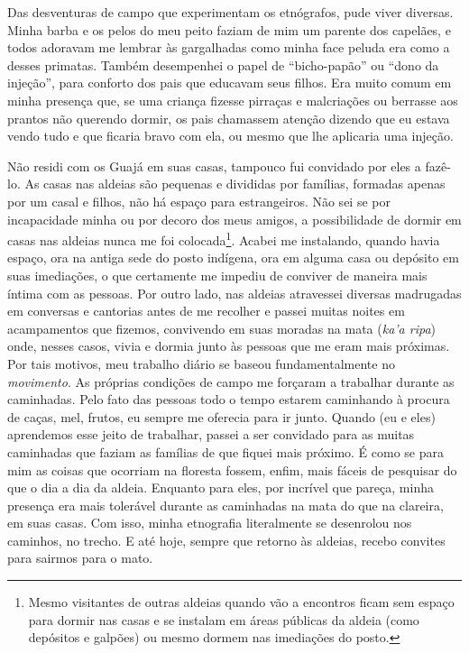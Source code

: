 Das desventuras de campo que experimentam os etnógrafos, pude viver
diversas. Minha barba e os pelos do meu peito faziam de mim um parente
dos capelães, e todos adoravam me lembrar às gargalhadas como minha face
peluda era como a desses primatas. Também desempenhei o papel de
``bicho-papão'' ou ``dono da injeção'', para conforto dos pais que
educavam seus filhos. Era muito comum em minha presença que, se uma
criança fizesse pirraças e malcriações ou berrasse aos prantos não
querendo dormir, os pais chamassem atenção dizendo que eu estava vendo
tudo e que ficaria bravo com ela, ou mesmo que lhe aplicaria uma
injeção.

Não residi com os Guajá em suas casas, tampouco fui convidado por eles a
fazê-lo. As casas nas aldeias são pequenas e divididas por famílias,
formadas apenas por um casal e filhos, não há espaço para estrangeiros.
Não sei se por incapacidade minha ou por decoro dos meus amigos, a
possibilidade de dormir em casas nas aldeias nunca me foi
colocada\footnote{Mesmo visitantes de outras aldeias quando vão a
  encontros ficam sem espaço para dormir nas casas e se instalam em
  áreas públicas da aldeia (como depósitos e galpões) ou mesmo dormem
  nas imediações do posto.}. Acabei me instalando, quando havia espaço,
ora na antiga sede do posto indígena, ora em alguma casa ou depósito em
suas imediações, o que certamente me impediu de conviver de maneira mais
íntima com as pessoas. Por outro lado, nas aldeias atravessei diversas
madrugadas em conversas e cantorias antes de me recolher e passei muitas
noites em acampamentos que fizemos, convivendo em suas moradas na mata
(\emph{ka'a ripa}) onde, nesses casos, vivia e dormia junto às pessoas
que me eram mais próximas. Por tais motivos, meu trabalho diário se
baseou fundamentalmente no \emph{movimento}. As próprias condições de
campo me forçaram a trabalhar durante as caminhadas. Pelo fato das
pessoas todo o tempo estarem caminhando à procura de caças, mel, frutos,
eu sempre me oferecia para ir junto. Quando (eu e eles) aprendemos esse
jeito de trabalhar, passei a ser convidado para as muitas caminhadas que
faziam as famílias de que fiquei mais próximo. É como se para mim as
coisas que ocorriam na floresta fossem, enfim, mais fáceis de pesquisar
do que o dia a dia da aldeia. Enquanto para eles, por incrível que
pareça, minha presença era mais tolerável durante as caminhadas na mata
do que na clareira, em suas casas. Com isso, minha etnografia
literalmente se desenrolou nos caminhos, no trecho. E até hoje, sempre
que retorno às aldeias, recebo convites para sairmos para o mato.

